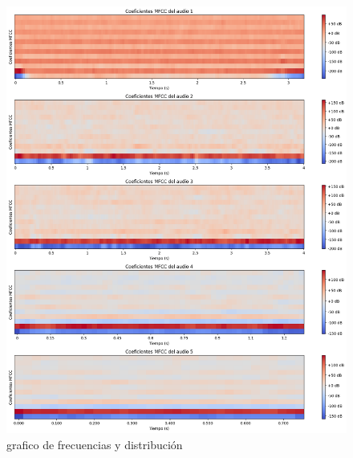 \begin{figure}[!h]
	\centering
	\includegraphics[width=15cm]{Images/Coeficientes}
	\caption{grafico de frecuencias y distribución}
	\label{fig:FyD}
\end{figure}

